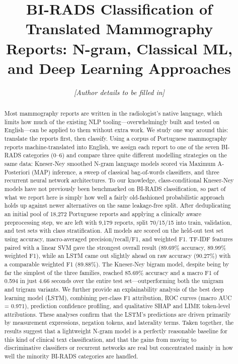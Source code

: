\documentclass[11pt,a4paper]{article}
\title{%
  \textbf{BI-RADS Classification of Translated Mammography Reports:
  N-gram, Classical ML, and Deep Learning Approaches}
}
\author{%
  \textit{[Author details to be filled in]}
}
\date{}
\begin{document}
\maketitle
\thispagestyle{empty}

\begin{abstract}
Most mammography reports are written in the radiologist's native language,
which limits how much of the existing NLP tooling---overwhelmingly built and
tested on English---can be applied to them without extra work.
We study one way around this: translate the reports first, then classify.
Using a corpus of Portuguese mammography reports machine-translated into
English, we assign each report to one of the seven BI-RADS categories (0--6)
and compare three quite different modelling strategies on the same data:
Kneser-Ney smoothed N-gram language models scored via Maximum A-Posteriori
(MAP) inference, a sweep of classical bag-of-words classifiers, and three
recurrent neural network architectures.
To our knowledge, class-conditional Kneser-Ney models have not previously been
benchmarked on BI-RADS classification, so part of what we report here is simply
how well a fairly old-fashioned probabilistic approach holds up against newer
alternatives on the same leakage-free split.
After deduplicating an initial pool of 18{,}272 Portuguese reports and applying
a clinically aware preprocessing step, we are left with 9{,}179 reports, split
70/15/15 into train, validation, and test sets with class stratification.
All models are scored on the held-out test set using accuracy, macro-averaged
precision/recall/F1, and weighted F1.
TF-IDF features paired with a linear SVM gave the strongest overall result
(89.69\% accuracy, 89.99\% weighted F1), while an LSTM came out slightly ahead
on raw accuracy (90.27\%) with a comparable weighted F1 (89.88\%).
The Kneser-Ney bigram model, despite being by far the simplest of the three
families, reached 85.69\% accuracy and a macro F1 of 0.594 in just 4.66 seconds
over the entire test set---outperforming both the unigram and trigram variants.
We further provide an explainability analysis of the best deep learning model
(LSTM), combining per-class F1 attribution, ROC curves (macro AUC = 0.971),
prediction confidence profiling, and qualitative SHAP and LIME token-level
attributions. These analyses confirm that the LSTM's predictions are driven
primarily by measurement expressions, negation tokens, and laterality terms.
Taken together, the results suggest that a lightweight N-gram model is a
perfectly reasonable baseline for this kind of clinical text classification,
and that the gains from moving to discriminative classifiers or recurrent
networks are real but concentrated mainly in how well the minority BI-RADS
categories are handled.
\end{abstract}
\end{document}
